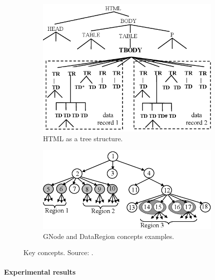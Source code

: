 \documentclass[10pt]{article}
\begin{document}
\begin{figure}[!b]
    \centering
    
    \begin{subfigure}[b]{.45\textwidth}
        \includegraphics[width=0.95\linewidth,left]{fig/html-as-tree.png}
        \caption{HTML as a tree structure.}
        \label{fig:html-as-tree}
    \end{subfigure}
    \begin{subfigure}[b]{.54\textwidth}
        
        \includegraphics[width=0.95\linewidth,right]{fig/gnode-and-dr.png}
        \caption{GNode and DataRegion concepts examples.}
        \label{fig:gnode-and-dr}
    \end{subfigure}
    
    \caption{Key concepts. Source: \cite{mdr}.}
    \label{fig:html-gnode-dr}
\end{figure}



\paragraph{Experimental results}
\end{document}
